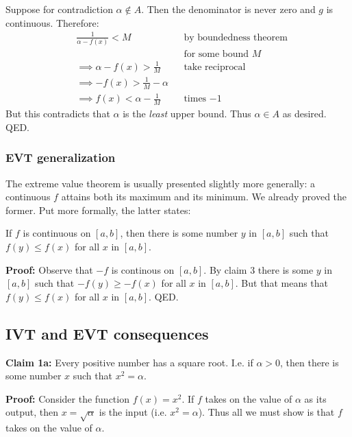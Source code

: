 Suppose for contradiction $\alpha\notin A$. Then the denominator is never zero
and $g$ is continuous. Therefore:
\begin{align*}
&\frac{1}{\alpha-f(x)}<M&&\text{by boundedness theorem}\\
& &&\text{for some bound $M$}\\
&\implies \alpha-f(x)>\frac{1}{M}&&\text{take reciprocal}\\
&\implies -f(x)>\frac{1}{M}-\alpha\\
&\implies f(x)<\alpha-\frac{1}{M}&&\text{times $-1$}
\end{align*}
But this contradicts that $\alpha$ is the \textit{least} upper bound. Thus
$\alpha\in A$ as desired. QED.

\subsubsection*{EVT generalization}

The extreme value theorem is usually presented slightly more
generally: a continuous $f$ attains both its maximum and its minimum.
We already proved the former. Put more formally, the latter states:

\vs

If $f$ is continuous on $[a,b]$, then there is some number $y$ in
$[a,b]$ such that $f(y)\leq f(x)$ for all $x$ in $[a,b]$.

\vs

\textbf{Proof:} Observe that $-f$ is continous on $[a,b]$. By claim 3
there is some $y$ in $[a,b]$ such that $-f(y)\geq-f(x)$ for all $x$ in
$[a,b]$. But that means that $f(y)\leq f(x)$ for all $x$ in $[a,b]$. QED.


\subsection{IVT and EVT consequences}

\textbf{Claim 1a:} Every positive number has a square root. I.e. if
$\alpha>0$, then there is some number $x$ such that $x^{2}=\alpha$.

\vs

\textbf{Proof:} Consider the function $f(x)=x^{2}$. If $f$ takes on
the value of $\alpha$ as its output, then $x=\sqrt{\alpha}$ is the input (i.e.
$x^{2}=\alpha$). Thus all we must show is that $f$ takes on the value of
$\alpha$.

\vs

